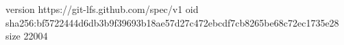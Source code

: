 version https://git-lfs.github.com/spec/v1
oid sha256:bf5722444d6db3b9f39693b18ae57d27c472ebcdf7cb8265be68c72ec1735e28
size 22004
